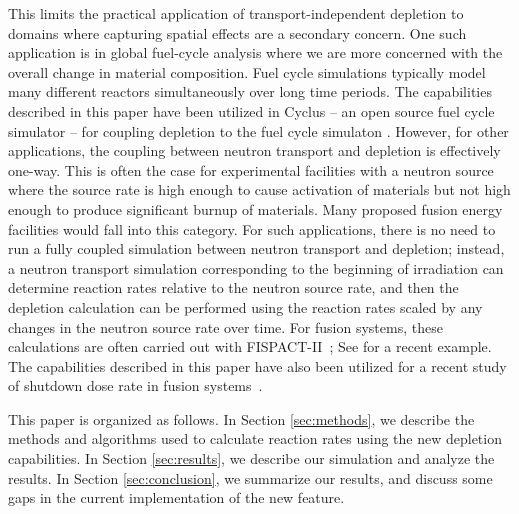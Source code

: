     This limits the practical application of transport-independent depletion to
    domains where capturing spatial effects are a secondary concern. One
    such application is in global fuel-cycle analysis where we are more
    concerned with the overall change in material composition. Fuel cycle
    simulations typically model many different reactors simultaneously over
    long time periods. The capabilities described in this paper
    have been utilized in Cyclus \citep{huff_fundamental_2016} -- an open source
    fuel cycle simulator -- for coupling depletion to the fuel cycle
    simulaton \citep{bachmann_os_2024}. However, for other applications, the
    coupling between neutron transport and depletion is effectively one-way.
    This is often the case for experimental facilities with a neutron source
    where the source rate is high enough to cause activation of materials but
    not high enough to produce significant burnup of materials. Many proposed fusion
    energy facilities would fall into this category.  For such applications, there is
    no need to run a fully coupled simulation between neutron transport and
    depletion; instead, a neutron transport simulation corresponding to the
    beginning of irradiation can determine reaction rates relative to the
    neutron source rate, and then the depletion calculation can be performed
    using the reaction rates scaled by any changes in the neutron source rate
    over time. For fusion systems, these calculations are often carried out with
    FISPACT-II~\citep{sublet2017nds}; See \citet{eade2020nf} for a recent
    example. The capabilities described in this paper have also been utilized
    for a recent study of shutdown dose rate in fusion
    systems~\citep{peterson2024nf}.

    This paper is organized as follows. In Section \ref{sec:methods}, we describe
    the methods and algorithms used to calculate reaction rates using the new
    depletion capabilities. In Section \ref{sec:results}, we describe our
    simulation and analyze the results. In Section \ref{sec:conclusion}, we
    summarize our results, and discuss some gaps in the current implementation
    of the new feature.


